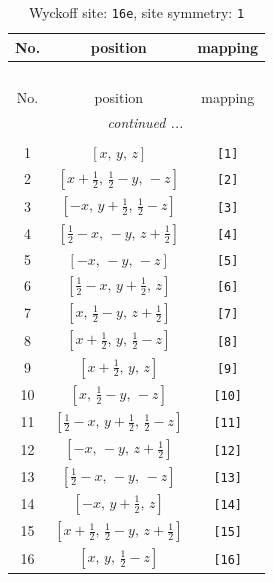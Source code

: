 \documentclass[fleqn,8pt]{jsarticle}
\begin{document}
\begin{longtable}{ccc}
\caption{Wyckoff site: {\tt 16e}, site symmetry: {\tt 1}}
 \\
 \hline \hline
No. & position & mapping \\ \hline \endfirsthead

\multicolumn{2}{l}{\tablename\ \thetable{}} \\
 \hline \hline
No. & position & mapping \\ \hline \endhead

 \hline \hline
\multicolumn{2}{r}{\footnotesize\it continued ...} \\ \endfoot

 \hline \hline
\multicolumn{2}{r}{} \\ \endlastfoot

1 & $\left[ x,\, y,\, z \right]$ & {\tt [1]} \\ \hline
2 & $\left[ x + \frac{1}{2},\, \frac{1}{2} - y,\, - z \right]$ & {\tt [2]} \\ \hline
3 & $\left[ - x,\, y + \frac{1}{2},\, \frac{1}{2} - z \right]$ & {\tt [3]} \\ \hline
4 & $\left[ \frac{1}{2} - x,\, - y,\, z + \frac{1}{2} \right]$ & {\tt [4]} \\ \hline
5 & $\left[ - x,\, - y,\, - z \right]$ & {\tt [5]} \\ \hline
6 & $\left[ \frac{1}{2} - x,\, y + \frac{1}{2},\, z \right]$ & {\tt [6]} \\ \hline
7 & $\left[ x,\, \frac{1}{2} - y,\, z + \frac{1}{2} \right]$ & {\tt [7]} \\ \hline
8 & $\left[ x + \frac{1}{2},\, y,\, \frac{1}{2} - z \right]$ & {\tt [8]} \\ \hline
9 & $\left[ x + \frac{1}{2},\, y,\, z \right]$ & {\tt [9]} \\ \hline
10 & $\left[ x,\, \frac{1}{2} - y,\, - z \right]$ & {\tt [10]} \\ \hline
11 & $\left[ \frac{1}{2} - x,\, y + \frac{1}{2},\, \frac{1}{2} - z \right]$ & {\tt [11]} \\ \hline
12 & $\left[ - x,\, - y,\, z + \frac{1}{2} \right]$ & {\tt [12]} \\ \hline
13 & $\left[ \frac{1}{2} - x,\, - y,\, - z \right]$ & {\tt [13]} \\ \hline
14 & $\left[ - x,\, y + \frac{1}{2},\, z \right]$ & {\tt [14]} \\ \hline
15 & $\left[ x + \frac{1}{2},\, \frac{1}{2} - y,\, z + \frac{1}{2} \right]$ & {\tt [15]} \\ \hline
16 & $\left[ x,\, y,\, \frac{1}{2} - z \right]$ & {\tt [16]} \\
\end{longtable}
\end{document}
